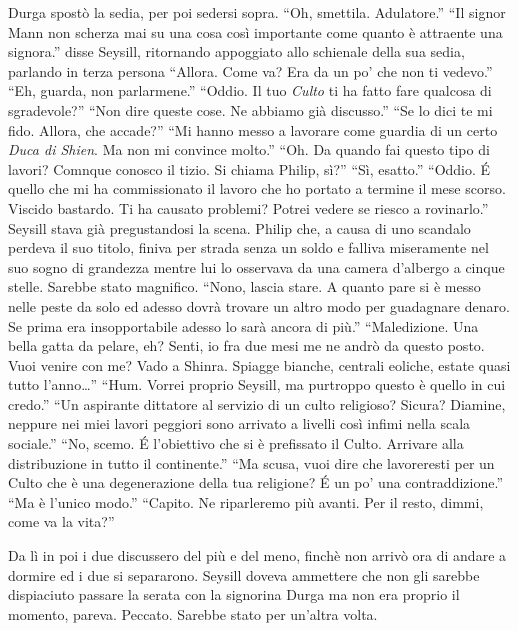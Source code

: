     Durga spostò la sedia, per poi sedersi sopra. ``Oh, smettila.
    Adulatore.'' ``Il signor Mann non scherza mai su una cosa così
    importante come quanto è attraente una signora.'' disse Seysill,
    ritornando appoggiato allo schienale della sua sedia, parlando in terza
    persona ``Allora. Come va? Era da un po' che non ti vedevo.'' ``Eh,
    guarda, non parlarmene.'' ``Oddio. Il tuo \emph{Culto} ti ha
    fatto fare qualcosa di sgradevole?'' ``Non dire queste cose. Ne abbiamo
    già discusso.'' ``Se lo dici te mi fido. Allora, che accade?'' ``Mi
    hanno messo a lavorare come guardia di un certo \emph{Duca di Shien}.
    Ma non mi convince molto.'' ``Oh. Da quando fai questo tipo di lavori?
    Comnque conosco il tizio. Si chiama Philip, sì?'' ``Sì, esatto.''
    ``Oddio. \'E quello che mi ha commissionato il lavoro che ho portato a
    termine il mese scorso. Viscido bastardo. Ti ha causato problemi? Potrei
    vedere se riesco a rovinarlo.'' Seysill stava già pregustandosi la
    scena. Philip che, a causa di uno scandalo perdeva il suo titolo,
    finiva per strada senza un soldo e falliva miseramente nel suo sogno di
    grandezza mentre lui lo osservava da una camera
    d'albergo a cinque stelle. Sarebbe stato magnifico. ``Nono, lascia
    stare. A quanto pare si è messo nelle peste da solo ed adesso dovrà
    trovare un altro modo per guadagnare denaro. Se prima era
    insopportabile adesso lo sarà ancora di più.'' ``Maledizione. Una bella
    gatta da pelare, eh? Senti, io fra due mesi me ne andrò da questo
    posto. Vuoi venire con me? Vado a Shinra. Spiagge bianche, centrali
    eoliche, estate quasi tutto l'anno\dots{}'' ``Hum. Vorrei proprio
    Seysill, ma purtroppo questo è quello in cui credo.'' ``Un aspirante
    dittatore al servizio di un culto religioso? Sicura? Diamine, neppure
    nei miei lavori peggiori sono arrivato a livelli così infimi nella
    scala sociale.'' ``No, scemo. \'E l'obiettivo che si è prefissato il
    Culto. Arrivare alla distribuzione in tutto il continente.'' ``Ma
    scusa, vuoi dire che lavoreresti per un Culto che è una degenerazione
    della tua religione? \'E un po' una contraddizione.'' ``Ma è l'unico
    modo.'' ``Capito. Ne riparleremo più avanti. Per il resto, dimmi, come
    va la vita?''

    Da lì in poi i due discussero del più e del meno, finchè non arrivò ora
    di andare a dormire ed i due si separarono. Seysill doveva ammettere
    che non gli sarebbe dispiaciuto passare la serata con la signorina
    Durga ma non era proprio il momento, pareva. Peccato. Sarebbe stato per
    un'altra volta.

